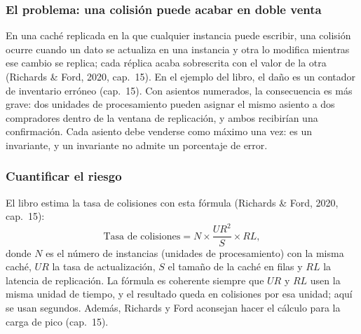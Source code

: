 
\subsubsection{El problema: una colisión puede acabar en doble venta}

En una caché replicada en la que cualquier instancia puede escribir, una colisión
ocurre cuando un dato se actualiza en una instancia y otra lo modifica mientras ese
cambio se replica; cada réplica acaba sobrescrita con el valor de la otra (Richards \&
Ford, 2020, cap.~15). En el ejemplo del libro, el daño es un contador de inventario
erróneo (cap.~15). Con asientos numerados, la consecuencia es más grave: dos unidades
de procesamiento pueden asignar el mismo asiento a dos compradores dentro de la
ventana de replicación, y ambos recibirían una confirmación. Cada asiento debe
venderse como máximo una vez: es un invariante, y un invariante no admite un
porcentaje de error.

\subsubsection{Cuantificar el riesgo}

El libro estima la tasa de colisiones con esta fórmula (Richards \& Ford, 2020,
cap.~15):
\[
  \text{Tasa de colisiones} = N \times \frac{\mathit{UR}^{2}}{S} \times \mathit{RL},
\]
donde $N$ es el número de instancias (unidades de procesamiento) con la misma caché,
$\mathit{UR}$ la tasa de actualización, $S$ el tamaño de la caché en filas y
$\mathit{RL}$ la latencia de replicación. La fórmula es coherente siempre que
$\mathit{UR}$ y $\mathit{RL}$ usen la misma unidad de tiempo, y el resultado queda en
colisiones por esa unidad; aquí se usan segundos. Además, Richards y Ford aconsejan
hacer el cálculo para la carga de pico (cap.~15).

